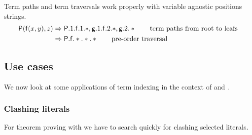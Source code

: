 \begin{example}
	Term paths and term traversals work properly with
	variable agnostic positions strings.
	\begin{align*}
		\mathsf{P}(\mathsf{f}(x,y),z)
		&\Rightarrow
		\mathsf{P}.1.\mathsf{f}.1.*, \mathsf{g}.1.\mathsf{f}.2.*, \mathsf{g}.2.*
		\tag*{term paths from root to leafs}
		\\
		&\Rightarrow \mathsf{P}.\mathsf{f}.*.*.*
		\tag*{pre-order traversal}
	\end{align*}
\end{example}

\subsection{Use cases}

We now look at some applications of term indexing in the context of 
\InstGen{} and \InstGenEQ{}.

\subsubsection{Clashing literals}

For theorem proving with \InstGen 
we have to search quickly for clashing selected literals.

